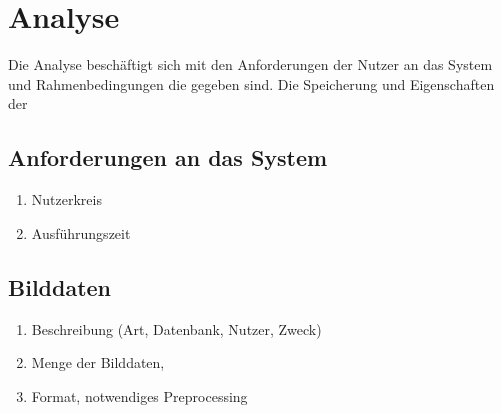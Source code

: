 \chapter{Analyse}

Die Analyse beschäftigt sich mit den Anforderungen der Nutzer an das System und Rahmenbedingungen die gegeben sind. Die Speicherung und Eigenschaften der 

\section{Anforderungen an das System}

\begin{enumerate}
	\item Nutzerkreis
	\item Ausführungszeit
\end{enumerate}

\section{Bilddaten}

\begin{enumerate}
	\item Beschreibung (Art, Datenbank, Nutzer, Zweck)
	\item Menge der Bilddaten, 
	\item Format, notwendiges Preprocessing
\end{enumerate}